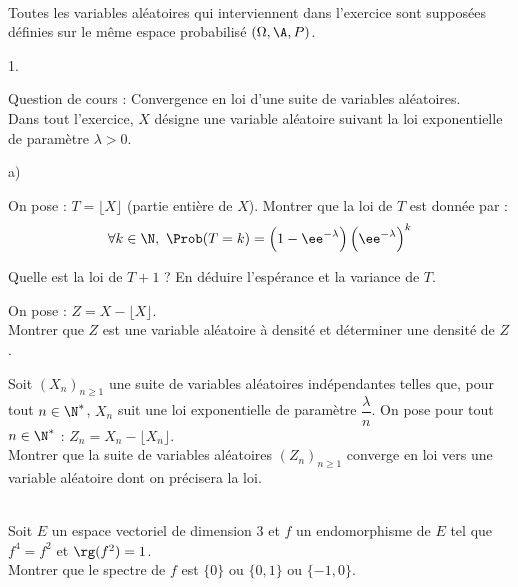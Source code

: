 \documentclass[11pt]{article}%
\begin{document}
\begin{exerciceAP}~\\
  Toutes les variables aléatoires qui interviennent dans l'exercice
  sont supposées définies sur le même espace probabilisé $(\Omega,
  \A,P)$.
  \begin{noliste}{1.}
    \setlength{\itemsep}{2mm}
  \item Question de cours : Convergence en loi d'une suite de
    variables aléatoires.\\
    Dans tout l'exercice, $X$ désigne une variable aléatoire suivant
    la loi exponentielle de paramètre $\lambda>0$.
  \item
    \begin{noliste}{a)}
    \setlength{\itemsep}{2mm}
    \item On pose : $T=\lfloor X\rfloor$ (partie entière de
      $X$). Montrer que la loi de $T$ est donnée par :
      \[
      \forall k \in\N, \
      \Prob(T=k)=\left(1-\ee^{-\lambda}\right)\left(\ee^{-\lambda}\right)^k
      \]
    \item Quelle est la loi de $T+1$ ? En déduire l'espérance et la
      variance de $T$.
    \end{noliste}
  \item On pose : $Z=X-\lfloor X\rfloor$.\\
    Montrer que $Z$ est une variable aléatoire à densité et déterminer
    une densité de $Z$.
  \item Soit $(X_n)_{n\geq 1}$ une suite de variables aléatoires
    indépendantes telles que, pour tout $n\in\N^*$, $X_n$ suit une loi
    exponentielle de paramètre $\dfrac{\lambda}{n}$. On pose pour tout
    $n\in\N^*$ : $Z_n=X_n-\lfloor X_n\rfloor$.\\
    Montrer que la suite de variables aléatoires $(Z_n)_{n\geq 1}$
    converge en loi vers une variable aléatoire dont on précisera la
    loi.
  \end{noliste}
\end{exerciceAP}


\begin{exerciceSP}~\\
  Soit $E$ un espace vectoriel de dimension $3$ et $f$ un
  endomorphisme de $E$ tel que $f^4=f^2$ et $\rg(f^2)=1$.\\
  Montrer que le spectre de $f$ est $\{0\}$ ou $\{0,1\}$ ou
  $\{-1,0\}$.
\end{exerciceSP}


\newpage
\end{document}
